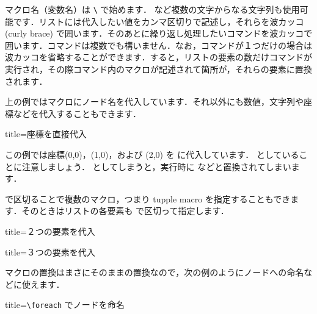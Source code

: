 \documentclass[../geometrymemo.tex]{subfiles}
\begin{document}
マクロ名（変数名）は \textbf{\texttt{\textbackslash}} で始めます．\lstinlineiv{\angleinrad} など複数の文字からなる文字列も使用可能です．リストには代入したい値をカンマ区切りで記述し，それらを波カッコ (curly brace) で囲います．そのあとに繰り返し処理したいコマンドを波カッコで囲います．コマンドは複数でも構いません．なお，コマンドが１つだけの場合は波カッコを省略することができます．すると，リストの要素の数だけコマンドが実行され，その際コマンド内のマクロが記述されて箇所が，それらの要素に置換されます．

上の例ではマクロにノード名を代入しています．それ以外にも数値，文字列や座標などを代入することもできます．
\begin{tcblisting}{title=座標を直接代入}
\end{tcblisting}
この例では座標(0,0)，(1,0)，および (2,0) を \lstinlineiv{\P} に代入しています． \lstinlineiv{\fill \P} としていることに注意しましょう． \lstinlineiv{\fill (\P)} としてしまうと，実行時に  などと置換されてしまいます．

\lstinlineiv{/} で区切ることで複数のマクロ，つまり tupple macro を指定することもできます．そのときはリストの各要素も \lstinlineiv{/} で区切って指定します．
\begin{tcblisting}{title=２つの要素を代入}
\end{tcblisting}
\begin{tcblisting}{title=３つの要素を代入}
\end{tcblisting}

マクロの置換はまさにそのままの置換なので，次の例のようにノードへの命名などに使えます．
\begin{tcblisting}{title=\texttt{\textbackslash{}foreach} でノードを命名}
\end{tcblisting}
\end{document}
